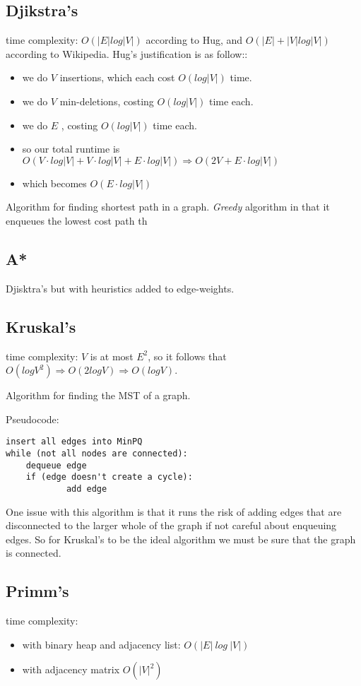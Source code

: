\documentclass[12pt, letterpaper]{article}
\begin{document}
\subsection{Djikstra's}
time complexity: $O(|E|log|V|)$ according to Hug, and $O(|E| + |V|log|V|)$ according to Wikipedia. Hug's justification is as follow::
\begin{itemize}
\item we do $V$ insertions, which each cost $O(log|V|)$ time.
\item we do $V$ min-deletions, costing $O(log|V|)$ time each.
\item we do $E$ , costing $O(log|V|)$ time each.
\item so our total runtime is $O(V\cdot log|V| + V\cdot log|V| + E\cdot log|V|) \Rightarrow O(2V+E\cdot log|V|)$
\item which becomes $O(E\cdot log|V|)$
\end{itemize}

Algorithm for finding shortest path in a graph. \textit{Greedy} algorithm in that it enqueues the lowest cost path th
\subsection{A*}
Djisktra's but with heuristics added to edge-weights.
\subsection{Kruskal's}
time complexity: $V$ is at most $E^2$, so it follows that 
$O(logV^2) \Rightarrow O(2logV) \Rightarrow O(logV)$.

Algorithm for finding the MST of a graph. 

Pseudocode: 
\begin{verbatim}
insert all edges into MinPQ
while (not all nodes are connected):
    dequeue edge
    if (edge doesn't create a cycle):
    	    add edge
\end{verbatim}
One issue with this algorithm is that it runs the risk of adding edges that are disconnected to the larger whole of the graph if not careful about enqueuing edges. So for Kruskal's to be the ideal algorithm we must be sure that the graph is connected.
\subsection{Primm's}
time complexity: 
\begin{itemize}
\item with binary heap and adjacency list: $O (|E|\ log\ |V|)$
\item with adjacency matrix $O (|V|^2)$
\end{itemize}
\end{document}
